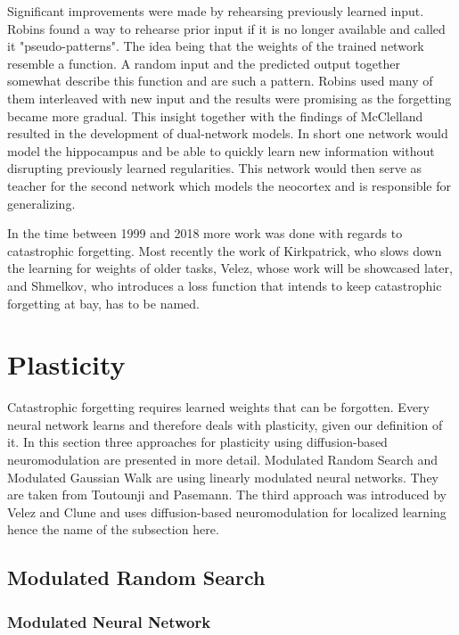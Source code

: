 \documentclass[12pt,twoside]{scrartcl}
\theoremstyle{plain}
\theoremstyle{definition}
\theoremstyle{remark}
\begin{document}
Significant improvements were made by rehearsing previously learned input.
Robins\cite{Robins1995} found a way to rehearse prior input if it is no longer
available and called it "pseudo-patterns". The idea being that the weights
of the trained network resemble a function. A random input and the predicted
output together somewhat describe this function and are such a pattern. Robins
used many of them interleaved with new input and the results were promising
as the forgetting became more gradual. This insight together with
the findings of McClelland\cite{McClelland1995} resulted in the development
of dual-network models.
In short one network would model the hippocampus and be able to quickly learn new
information without disrupting previously learned regularities. This network
would then serve as teacher for the second network which models the neocortex
and is responsible for generalizing.

In the time between 1999 and 2018 more work was done with regards to catastrophic
forgetting. Most recently the work of Kirkpatrick\cite{Kirkpatrick2017}, who
slows down the learning for weights of older tasks,
Velez\cite{Velez2017}, whose work will be showcased later, and
Shmelkov\cite{Shmelkov2017}, who introduces a loss function that intends to keep
catastrophic forgetting at bay, has to be named.

\section{Plasticity}
\label{sec:plasticity}

Catastrophic forgetting requires learned weights that can be forgotten.
Every neural network learns and therefore deals with plasticity, given our
definition of it. In this section three approaches for plasticity using diffusion-based
neuromodulation are presented in more detail. Modulated Random Search and
Modulated Gaussian Walk are using linearly modulated neural networks. They
are taken from Toutounji and Pasemann\cite{Toutounji2016}. The third approach
was introduced by Velez and Clune\cite{Velez2017} and uses diffusion-based neuromodulation
for localized learning hence the name of the subsection here.

\subsection{Modulated Random Search}
\label{subsec:mrs}

\subsubsection*{Modulated Neural Network}
\end{document}
